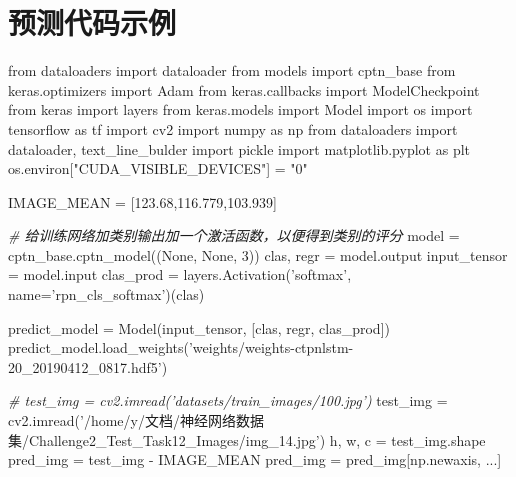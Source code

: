 \documentclass[11pt]{article}
\newenvironment{Shaded}{}{}
\newcommand{\DecValTok}[1]{\textcolor[rgb]{0.25,0.63,0.44}{{#1}}}
\newcommand{\FloatTok}[1]{\textcolor[rgb]{0.25,0.63,0.44}{{#1}}}
\newcommand{\StringTok}[1]{\textcolor[rgb]{0.25,0.44,0.63}{{#1}}}
\newcommand{\CommentTok}[1]{\textcolor[rgb]{0.38,0.63,0.69}{\textit{{#1}}}}
\newcommand{\NormalTok}[1]{{#1}}
\newcommand{\ImportTok}[1]{{#1}}
\newcommand{\VariableTok}[1]{\textcolor[rgb]{0.10,0.09,0.49}{{#1}}}
\newcommand{\OperatorTok}[1]{\textcolor[rgb]{0.40,0.40,0.40}{{#1}}}
\newcommand{\BuiltInTok}[1]{{#1}}
\begin{document}
    \hypertarget{ux9884ux6d4bux4ee3ux7801ux793aux4f8b}{%
\section{预测代码示例}\label{ux9884ux6d4bux4ee3ux7801ux793aux4f8b}}

    \begin{Shaded}
\begin{Highlighting}[]
\ImportTok{from}\NormalTok{ dataloaders }\ImportTok{import}\NormalTok{ dataloader}
\ImportTok{from}\NormalTok{ models }\ImportTok{import}\NormalTok{ cptn_base}
\ImportTok{from}\NormalTok{ keras.optimizers }\ImportTok{import}\NormalTok{ Adam }
\ImportTok{from}\NormalTok{ keras.callbacks }\ImportTok{import}\NormalTok{ ModelCheckpoint}
\ImportTok{from}\NormalTok{ keras }\ImportTok{import}\NormalTok{ layers}
\ImportTok{from}\NormalTok{ keras.models }\ImportTok{import}\NormalTok{ Model}
\ImportTok{import}\NormalTok{ os}
\ImportTok{import}\NormalTok{ tensorflow }\ImportTok{as}\NormalTok{ tf}
\ImportTok{import}\NormalTok{ cv2}
\ImportTok{import}\NormalTok{ numpy }\ImportTok{as}\NormalTok{ np}
\ImportTok{from}\NormalTok{ dataloaders }\ImportTok{import}\NormalTok{ dataloader, text_line_bulder}
\ImportTok{import}\NormalTok{ pickle}
\ImportTok{import}\NormalTok{ matplotlib.pyplot }\ImportTok{as}\NormalTok{ plt}
\NormalTok{os.environ[}\StringTok{"CUDA_VISIBLE_DEVICES"}\NormalTok{] }\OperatorTok{=} \StringTok{"0"}


\NormalTok{IMAGE_MEAN }\OperatorTok{=}\NormalTok{ [}\FloatTok{123.68}\NormalTok{,}\FloatTok{116.779}\NormalTok{,}\FloatTok{103.939}\NormalTok{]}


\CommentTok{# 给训练网络加类别输出加一个激活函数，以便得到类别的评分}
\NormalTok{model }\OperatorTok{=}\NormalTok{ cptn_base.cptn_model((}\VariableTok{None}\NormalTok{, }\VariableTok{None}\NormalTok{, }\DecValTok{3}\NormalTok{))}
\NormalTok{clas, regr }\OperatorTok{=}\NormalTok{ model.output}
\NormalTok{input_tensor }\OperatorTok{=}\NormalTok{ model.}\BuiltInTok{input}
\NormalTok{clas_prod }\OperatorTok{=}\NormalTok{ layers.Activation(}\StringTok{'softmax'}\NormalTok{, name}\OperatorTok{=}\StringTok{'rpn_cls_softmax'}\NormalTok{)(clas)}

\NormalTok{predict_model }\OperatorTok{=}\NormalTok{ Model(input_tensor, [clas, regr, clas_prod])}
\NormalTok{predict_model.load_weights(}\StringTok{'weights/weights-ctpnlstm-20_20190412_0817.hdf5'}\NormalTok{)}

\CommentTok{# test_img = cv2.imread('datasets/train_images/100.jpg')}
\NormalTok{test_img }\OperatorTok{=}\NormalTok{ cv2.imread(}\StringTok{'/home/y/文档/神经网络数据集/Challenge2_Test_Task12_Images/img_14.jpg'}\NormalTok{)}
\NormalTok{h, w, c }\OperatorTok{=}\NormalTok{ test_img.shape}
\NormalTok{pred_img }\OperatorTok{=}\NormalTok{ test_img }\OperatorTok{-}\NormalTok{ IMAGE_MEAN}
\NormalTok{pred_img }\OperatorTok{=}\NormalTok{ pred_img[np.newaxis, ...]}


\end{Highlighting}
\end{Shaded}
\end{document}
